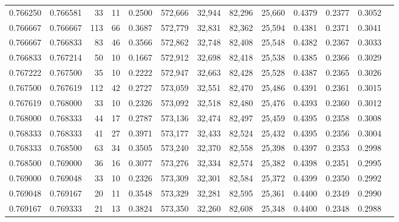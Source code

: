 \begin{tabular}{rrrrrrrrrrrrr}
0.766250 & 0.766581 &    33 &  11 &                                     0.2500 & 572,666 &  32,944 &  82,296 &  25,660 & 0.4379 & 0.2377 & 0.3052 \\
0.766667 & 0.766667 &   113 &  66 &                                     0.3687 & 572,779 &  32,831 &  82,362 &  25,594 & 0.4381 & 0.2371 & 0.3041 \\
0.766667 & 0.766833 &    83 &  46 &                                     0.3566 & 572,862 &  32,748 &  82,408 &  25,548 & 0.4382 & 0.2367 & 0.3033 \\
0.766833 & 0.767214 &    50 &  10 &                                     0.1667 & 572,912 &  32,698 &  82,418 &  25,538 & 0.4385 & 0.2366 & 0.3029 \\
0.767222 & 0.767500 &    35 &  10 &                                     0.2222 & 572,947 &  32,663 &  82,428 &  25,528 & 0.4387 & 0.2365 & 0.3026 \\
0.767500 & 0.767619 &   112 &  42 &                                     0.2727 & 573,059 &  32,551 &  82,470 &  25,486 & 0.4391 & 0.2361 & 0.3015 \\
0.767619 & 0.768000 &    33 &  10 &                                     0.2326 & 573,092 &  32,518 &  82,480 &  25,476 & 0.4393 & 0.2360 & 0.3012 \\
0.768000 & 0.768333 &    44 &  17 &                                     0.2787 & 573,136 &  32,474 &  82,497 &  25,459 & 0.4395 & 0.2358 & 0.3008 \\
0.768333 & 0.768333 &    41 &  27 &                                     0.3971 & 573,177 &  32,433 &  82,524 &  25,432 & 0.4395 & 0.2356 & 0.3004 \\
0.768333 & 0.768500 &    63 &  34 &                                     0.3505 & 573,240 &  32,370 &  82,558 &  25,398 & 0.4397 & 0.2353 & 0.2998 \\
0.768500 & 0.769000 &    36 &  16 &                                     0.3077 & 573,276 &  32,334 &  82,574 &  25,382 & 0.4398 & 0.2351 & 0.2995 \\
0.769000 & 0.769048 &    33 &  10 &                                     0.2326 & 573,309 &  32,301 &  82,584 &  25,372 & 0.4399 & 0.2350 & 0.2992 \\
0.769048 & 0.769167 &    20 &  11 &                                     0.3548 & 573,329 &  32,281 &  82,595 &  25,361 & 0.4400 & 0.2349 & 0.2990 \\
0.769167 & 0.769333 &    21 &  13 &                                     0.3824 & 573,350 &  32,260 &  82,608 &  25,348 & 0.4400 & 0.2348 & 0.2988 \\

\end{tabular}
